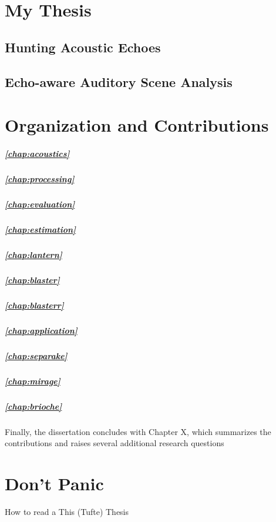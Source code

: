 \section{My Thesis}
\subsection{Hunting Acoustic Echoes}
\subsection{Echo-aware Auditory Scene Analysis}


\section{Organization and Contributions}
\subparagraph{\cref{chap:acoustics}}\blindtext
\subparagraph{\cref{chap:processing}}\blindtext
\subparagraph{\cref{chap:evaluation}}\blindtext

\subparagraph{\cref{chap:estimation}}\blindtext
\subparagraph{\cref{chap:lantern}}\blindtext
\subparagraph{\cref{chap:blaster}}\blindtext
\subparagraph{\cref{chap:blasterr}}\blindtext


\subparagraph{\cref{chap:application}}\blindtext
\subparagraph{\cref{chap:separake}}\blindtext
\subparagraph{\cref{chap:mirage}}\blindtext
\subparagraph{\cref{chap:brioche}}\blindtext


Finally, the dissertation concludes with Chapter X, which summarizes
the contributions and raises several additional research questions


\section{Don't Panic}
How to read a This (Tufte) Thesis